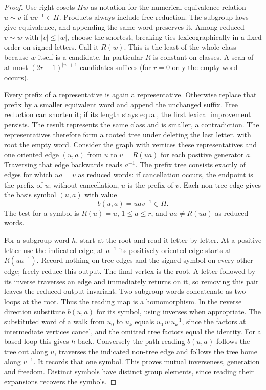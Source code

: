 \begin{proof}
Use right cosets $Hw$ as notation for the numerical equivalence relation
$u\sim v$ if $uv^{-1}\in H$. Products always include free reduction. The subgroup laws give equivalence, and appending the same word preserves it. Among reduced $v\sim w$ with $|v|\le |w|$, choose the shortest, breaking ties lexicographically in a fixed order on signed letters. Call it $R(w)$. This is the least of the whole class because $w$ itself is a candidate. In particular $R$ is constant on classes. A scan of at most $(2r+1)^{|w|+1}$ candidates suffices (for $r=0$ only the empty word occurs).

Every prefix of a representative is again a representative. Otherwise replace that prefix by a smaller equivalent word and append the unchanged suffix. Free reduction can shorten it; if its length stays equal, the first lexical improvement persists. The result represents the same class and is smaller, a contradiction. The representatives therefore form a rooted tree under deleting the last letter, with root the empty word. Consider the graph with vertices these representatives and one oriented edge $(u,a)$ from $u$ to $v=R(ua)$ for each positive generator $a$. Traversing that edge backwards reads $a^{-1}$. The prefix tree consists exactly of edges for which $ua=v$ as reduced words: if cancellation occurs, the endpoint is the prefix of $u$; without cancellation, $u$ is the prefix of $v$. Each non-tree edge gives the basis symbol $(u,a)$ with value
\[
                          b(u,a)=uav^{-1}\in H .
\]
The test for a symbol is $R(u)=u$, $1\le a\le r$, and $ua\ne R(ua)$ as reduced words.

For a subgroup word $h$, start at the root and read it letter by letter. At a positive letter use the indicated edge; at $a^{-1}$ its positively oriented edge starts at $R(ua^{-1})$. Record nothing on tree edges and the signed symbol on every other edge; freely reduce this output. The final vertex is the root. A letter followed by its inverse traverses an edge and immediately returns on it, so removing this pair leaves the reduced output invariant. Two subgroup words concatenate as two loops at the root. Thus the reading map is a homomorphism. In the reverse direction substitute $b(u,a)$ for its symbol, using inverses when appropriate. The substituted word of a walk from $u_0$ to $u_k$ equals $u_0\,w\,u_k^{-1}$, since the factors at intermediate vertices cancel, and the omitted tree factors equal the identity. For a based loop this gives $h$ back. Conversely the path reading $b(u,a)$ follows the tree out along $u$, traverses the indicated non-tree edge and follows the tree home along $v^{-1}$. It records that one symbol. This proves mutual inverseness, generation and freedom. Distinct symbols have distinct group elements, since reading their expansions recovers the symbols.


\end{proof}
